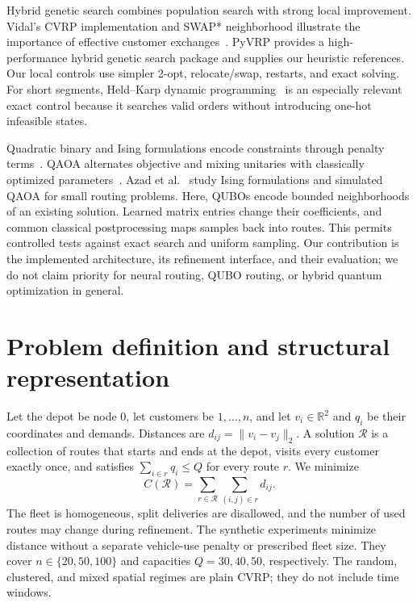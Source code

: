 \documentclass[11pt,a4paper]{article}
\newcommand{\R}{\mathcal{R}}
\begin{document}
Hybrid genetic search combines population search with strong local
improvement. Vidal's CVRP implementation and SWAP* neighborhood illustrate
the importance of effective customer exchanges~\cite{vidal2022hgs}.
PyVRP provides a high-performance hybrid genetic search package
\cite{wouda2024pyvrp} and supplies our heuristic references. Our local
controls use simpler 2-opt, relocate/swap, restarts, and exact solving.
For short segments, Held--Karp dynamic programming~\cite{held1962dynamic}
is an especially relevant exact control because it searches valid orders
without introducing one-hot infeasible states.

Quadratic binary and Ising formulations encode constraints through penalty
terms~\cite{lucas2014ising}. QAOA alternates objective and mixing unitaries
with classically optimized parameters~\cite{farhi2014qaoa}.
Azad et al.~\cite{azad2020vrp} study Ising formulations and simulated QAOA
for small routing problems. Here, QUBOs encode bounded neighborhoods of
an existing solution. Learned matrix entries change their coefficients,
and common classical postprocessing maps samples back into routes.
This permits controlled tests against exact search and uniform sampling.
Our contribution is the implemented architecture, its refinement interface,
and their evaluation; we do not claim priority for neural routing,
QUBO routing, or hybrid quantum optimization in general.

\section{Problem definition and structural representation}
\label{sec:problem}

Let the depot be node $0$, let customers be $1,\ldots,n$, and let
$v_i\in\mathbb R^2$ and $q_i$ be their coordinates and demands. Distances
are $d_{ij}=\|v_i-v_j\|_2$. A solution $\R$ is a collection of routes
that starts and ends at the depot, visits every customer exactly once,
and satisfies $\sum_{i\in r}q_i\leq Q$ for every route $r$. We minimize
\begin{equation}
 C(\R)=\sum_{r\in\R}\sum_{(i,j)\in r}d_{ij}.
 \label{eq:cvrp-cost}
\end{equation}
The fleet is homogeneous, split deliveries are disallowed, and the number
of used routes may change during refinement. The synthetic experiments
minimize distance without a separate vehicle-use penalty or prescribed
fleet size. They cover $n\in\{20,50,100\}$ and capacities $Q=30,40,50$,
respectively. The random, clustered, and mixed spatial regimes are plain
CVRP; they do not include time windows.
\end{document}
